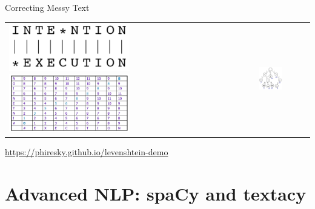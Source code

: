 \documentclass[10pt]{beamer}
\begin{document}
\begin{frame}{Correcting Messy Text}

\begin{tabular}{p{5cm} p{7cm}}
    \vspace{0pt}
    \includegraphics[width=0.5\textwidth]{figures/string-alignment.png}
	\vspace{0pt}
    \includegraphics[width=0.5\textwidth]{figures/edit-distance-table.png}
    &
    \vspace{0pt}
    \includegraphics[width=0.5\textwidth]{figures/trie-example.png}
\end{tabular}

\begin{center}
\url{https://phiresky.github.io/levenshtein-demo}
\end{center}

\end{frame}

\section{Advanced NLP: spaCy and textacy}

%
\end{document}
